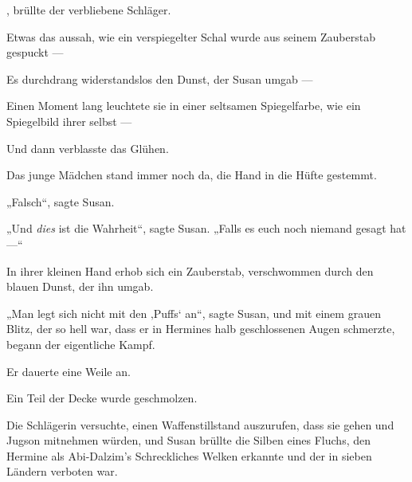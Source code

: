 , brüllte der verbliebene Schläger.

Etwas das aussah, wie ein verspiegelter Schal wurde aus seinem Zauberstab gespuckt —

Es durchdrang widerstandslos den Dunst, der Susan umgab —

Einen Moment lang leuchtete sie in einer seltsamen Spiegelfarbe, wie ein Spiegelbild ihrer selbst —

Und dann verblasste das Glühen.

Das junge Mädchen stand immer noch da, die Hand in die Hüfte gestemmt.

„Falsch“, sagte Susan.

„Und \emph{dies} ist die Wahrheit“, sagte Susan.
„Falls es euch noch niemand gesagt hat —“

In ihrer kleinen Hand erhob sich ein Zauberstab, verschwommen durch den blauen Dunst, der ihn umgab.

„Man legt sich nicht mit den ‚Puffs‘ an“, sagte Susan, und mit einem grauen Blitz, der so hell war, dass er in Hermines halb geschlossenen Augen schmerzte, begann der eigentliche Kampf.

Er dauerte eine Weile an.

Ein Teil der Decke wurde geschmolzen.

Die Schlägerin versuchte, einen Waffenstillstand auszurufen, dass sie gehen und Jugson mitnehmen würden, und Susan brüllte die Silben eines Fluchs, den Hermine als Abi-Dalzim’s Schreckliches Welken erkannte und der in sieben Ländern verboten war.


